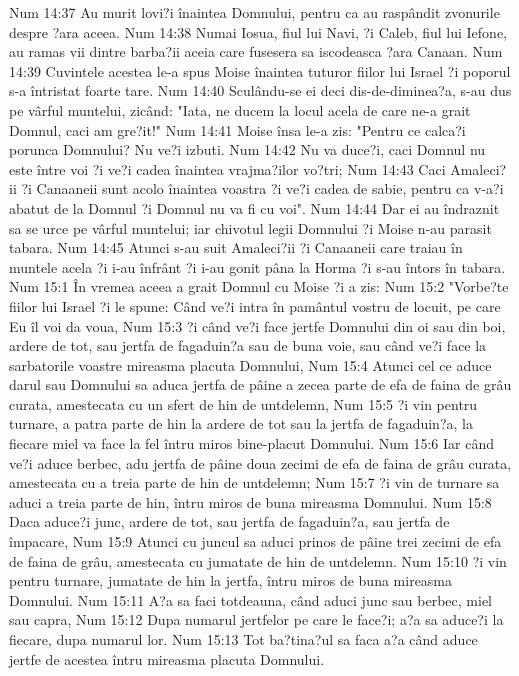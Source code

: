 Num 14:37  Au murit lovi?i înaintea Domnului, pentru ca au raspândit zvonurile despre ?ara aceea.
Num 14:38  Numai Iosua, fiul lui Navi, ?i Caleb, fiul lui Iefone, au ramas vii dintre barba?ii aceia care fusesera sa iscodeasca ?ara Canaan.
Num 14:39  Cuvintele acestea le-a spus Moise înaintea tuturor fiilor lui Israel ?i poporul s-a întristat foarte tare.
Num 14:40  Sculându-se ei deci dis-de-diminea?a, s-au dus pe vârful muntelui, zicând: "Iata, ne ducem la locul acela de care ne-a grait Domnul, caci am gre?it!"
Num 14:41  Moise însa le-a zis: "Pentru ce calca?i porunca Domnului? Nu ve?i izbuti.
Num 14:42  Nu va duce?i, caci Domnul nu este între voi ?i ve?i cadea înaintea vrajma?ilor vo?tri;
Num 14:43  Caci Amaleci?ii ?i Canaaneii sunt acolo înaintea voastra ?i ve?i cadea de sabie, pentru ca v-a?i abatut de la Domnul ?i Domnul nu va fi cu voi".
Num 14:44  Dar ei au îndraznit sa se urce pe vârful muntelui; iar chivotul legii Domnului ?i Moise n-au parasit tabara.
Num 14:45  Atunci s-au suit Amaleci?ii ?i Canaaneii care traiau în muntele acela ?i i-au înfrânt ?i i-au gonit pâna la Horma ?i s-au întors în tabara.
Num 15:1  În vremea aceea a grait Domnul cu Moise ?i a zis:
Num 15:2  "Vorbe?te fiilor lui Israel ?i le spune: Când ve?i intra în pamântul vostru de locuit, pe care Eu îl voi da voua,
Num 15:3  ?i când ve?i face jertfe Domnului din oi sau din boi, ardere de tot, sau jertfa de fagaduin?a sau de buna voie, sau când ve?i face la sarbatorile voastre mireasma placuta Domnului,
Num 15:4  Atunci cel ce aduce darul sau Domnului sa aduca jertfa de pâine a zecea parte de efa de faina de grâu curata, amestecata cu un sfert de hin de untdelemn,
Num 15:5  ?i vin pentru turnare, a patra parte de hin la ardere de tot sau la jertfa de fagaduin?a, la fiecare miel va face la fel întru miros bine-placut Domnului.
Num 15:6  Iar când ve?i aduce berbec, adu jertfa de pâine doua zecimi de efa de faina de grâu curata, amestecata cu a treia parte de hin de untdelemn;
Num 15:7  ?i vin de turnare sa aduci a treia parte de hin, întru miros de buna mireasma Domnului.
Num 15:8  Daca aduce?i junc, ardere de tot, sau jertfa de fagaduin?a, sau jertfa de împacare,
Num 15:9  Atunci cu juncul sa aduci prinos de pâine trei zecimi de efa de faina de grâu, amestecata cu jumatate de hin de untdelemn.
Num 15:10  ?i vin pentru turnare, jumatate de hin la jertfa, întru miros de buna mireasma Domnului.
Num 15:11  A?a sa faci totdeauna, când aduci junc sau berbec, miel sau capra,
Num 15:12  Dupa numarul jertfelor pe care le face?i; a?a sa aduce?i la fiecare, dupa numarul lor.
Num 15:13  Tot ba?tina?ul sa faca a?a când aduce jertfe de acestea întru mireasma placuta Domnului.
